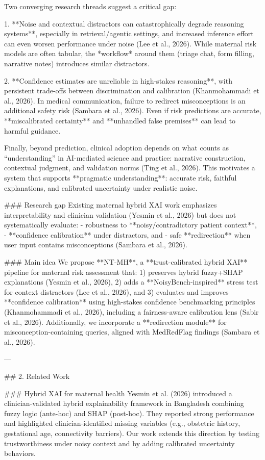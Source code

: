 Two converging research threads suggest a critical gap:

1. **Noise and contextual distractors can catastrophically degrade reasoning systems**, especially in retrieval/agentic settings, and increased inference effort can even worsen performance under noise (Lee et al., 2026). While maternal risk models are often tabular, the *workflow* around them (triage chat, form filling, narrative notes) introduces similar distractors.

2. **Confidence estimates are unreliable in high-stakes reasoning**, with persistent trade-offs between discrimination and calibration (Khanmohammadi et al., 2026). In medical communication, failure to redirect misconceptions is an additional safety risk (Sambara et al., 2026). Even if risk predictions are accurate, **miscalibrated certainty** and **unhandled false premises** can lead to harmful guidance.

Finally, beyond prediction, clinical adoption depends on what counts as “understanding” in AI-mediated science and practice: narrative construction, contextual judgment, and validation norms (Ting et al., 2026). This motivates a system that supports **pragmatic understanding**: accurate risk, faithful explanations, and calibrated uncertainty under realistic noise.

### Research gap  
Existing maternal hybrid XAI work emphasizes interpretability and clinician validation (Yesmin et al., 2026) but does not systematically evaluate:  
- robustness to **noisy/contradictory patient context**,  
- **confidence calibration** under distractors, and  
- safe **redirection** when user input contains misconceptions (Sambara et al., 2026).

### Main idea  
We propose **NT-MH**, a **trust-calibrated hybrid XAI** pipeline for maternal risk assessment that:  
1) preserves hybrid fuzzy+SHAP explanations (Yesmin et al., 2026),  
2) adds a **NoisyBench-inspired** stress test for context distractors (Lee et al., 2026), and  
3) evaluates and improves **confidence calibration** using high-stakes confidence benchmarking principles (Khanmohammadi et al., 2026), including a fairness-aware calibration lens (Sabir et al., 2026).  
Additionally, we incorporate a **redirection module** for misconception-containing queries, aligned with MedRedFlag findings (Sambara et al., 2026).

---

## 2. Related Work  

### Hybrid XAI for maternal health  
Yesmin et al. (2026) introduced a clinician-validated hybrid explainability framework in Bangladesh combining fuzzy logic (ante-hoc) and SHAP (post-hoc). They reported strong performance and highlighted clinician-identified missing variables (e.g., obstetric history, gestational age, connectivity barriers). Our work extends this direction by testing trustworthiness under noisy context and by adding calibrated uncertainty behaviors.

